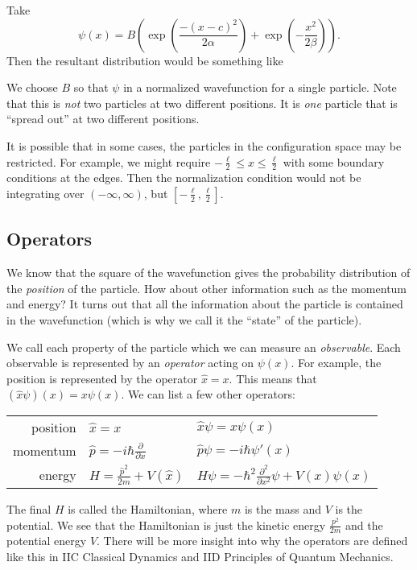 \documentclass[a4paper]{article}
\begin{document}
\begin{eg}
  Take
  \[
    \psi(x) = B\left(\exp\left(\frac{-(x - c)^2}{2\alpha}\right) + \exp\left(-\frac{x^2}{2\beta}\right)\right).
  \]
  Then the resultant distribution would be something like
  \begin{center}
  \end{center}
  We choose $B$ so that $\psi$ in a normalized wavefunction for a single particle. Note that this is \emph{not} two particles at two different positions. It is \emph{one} particle that is ``spread out'' at two different positions.
\end{eg}
It is possible that in some cases, the particles in the configuration space may be restricted. For example, we might require $ -\frac{\ell}{2} \leq x \leq \frac{\ell}{2}$ with some boundary conditions at the edges. Then the normalization condition would not be integrating over $(-\infty, \infty)$, but $[-\frac{\ell}{2}, \frac{\ell}{2}]$.

\subsection{Operators}
We know that the square of the wavefunction gives the probability distribution of the \emph{position} of the particle. How about other information such as the momentum and energy? It turns out that all the information about the particle is contained in the wavefunction (which is why we call it the ``state'' of the particle).

We call each property of the particle which we can measure an \emph{observable}. Each observable is represented by an \emph{operator} acting on $\psi(x)$. For example, the position is represented by the operator $\hat{x} = x$. This means that $(\hat{x} \psi)(x) = x\psi(x)$. We can list a few other operators:
\begin{center}
  \begin{tabular}{rll}
    position & $\hat{x} = x$ & $\hat{x} \psi = x\psi(x)$\\
    momentum & $\hat{p} = -i\hbar \frac{\partial}{\partial x}$ & $\hat{p}\psi = -i\hbar \psi'(x)$\\
    energy & $H = \frac{\hat{p}^2}{2m} + V(\hat{x})$ & $H\psi = -\hbar^2 \frac{\partial^2}{\partial x^2}\psi  + V(x)\psi(x)$
  \end{tabular}
\end{center}
The final $H$ is called the Hamiltonian, where $m$ is the mass and $V$ is the potential. We see that the Hamiltonian is just the kinetic energy $\frac{p^2}{2m}$ and the potential energy $V$. There will be more insight into why the operators are defined like this in IIC Classical Dynamics and IID Principles of Quantum Mechanics.
\end{document}
